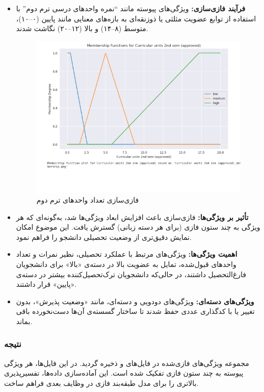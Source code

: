 \begin{itemize}
	\item \textbf{فرآیند فازی‌سازی:} ویژگی‌های پیوسته مانند ``نمره واحدهای درسی ترم دوم'' با استفاده از توابع عضویت مثلثی یا ذوزنقه‌ای به بازه‌های معنایی مانند پایین (۰--۱۰)، متوسط (۸--۱۴) و بالا (۱۲--۲۰) نگاشت شدند.
	
	\begin{figure}[H]
		\centering
		\includegraphics[width=0.6\linewidth]{img/fuzzy}
		\caption[]{فازی‌سازی تعداد واحدهای ترم دوم}
		\label{fig:fuzzy}
	\end{figure}
	
	
	\item \textbf{تأثیر بر ویژگی‌ها:} فازی‌سازی باعث افزایش ابعاد ویژگی‌ها شد، به‌گونه‌ای که هر ویژگی به چند ستون فازی (برای هر دسته زبانی) گسترش یافت. این موضوع امکان نمایش دقیق‌تری از وضعیت تحصیلی دانشجو را فراهم نمود.
	
	\item \textbf{اهمیت ویژگی‌ها:} ویژگی‌های مرتبط با عملکرد تحصیلی، نظیر نمرات و تعداد واحدهای قبول‌شده، تمایل به عضویت بالا در دسته‌ی «بالا» برای دانشجویان فارغ‌التحصیل داشتند، در حالی‌که دانشجویان ترک‌تحصیل‌کننده بیشتر در دسته‌ی «پایین» قرار داشتند.
	
	\item \textbf{ویژگی‌های دسته‌ای:} ویژگی‌های دودویی و دسته‌ای، مانند «وضعیت پذیرش»، بدون تغییر یا با کدگذاری عددی حفظ شدند تا ساختار گسسته‌ی آن‌ها دست‌نخورده باقی بماند.
\end{itemize}

\subsubsection{نتیجه}

مجموعه ویژگی‌های فازی‌شده در فایل‌های  و  ذخیره گردید. در این فایل‌ها، هر ویژگی پیوسته به چند ستون فازی تفکیک شده است. این آماده‌سازی داده‌ها، تفسیرپذیری بالاتری را برای مدل طبقه‌بند فازی در وظایف بعدی فراهم ساخت.

